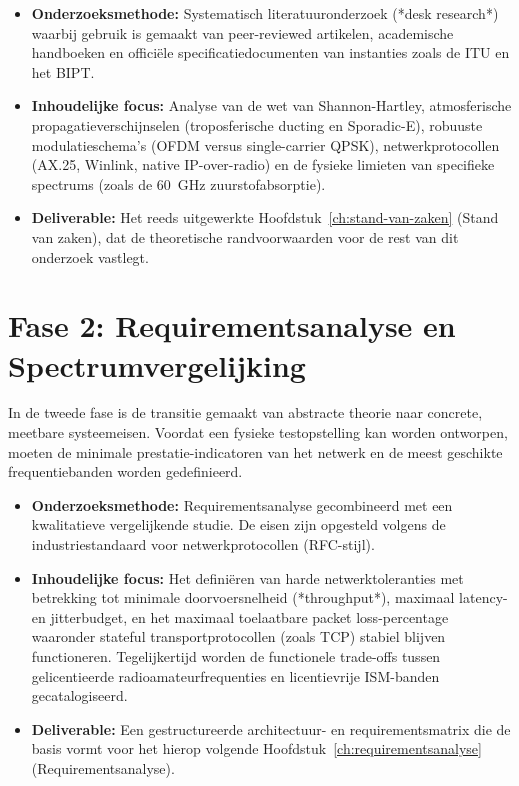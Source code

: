 \begin{itemize}
    \item \textbf{Onderzoeksmethode:} Systematisch literatuuronderzoek (*desk research*) 
    waarbij gebruik is gemaakt van peer-reviewed artikelen, academische handboeken en 
    officiële specificatiedocumenten van instanties zoals de ITU en het BIPT.
    \item \textbf{Inhoudelijke focus:} Analyse van de wet van Shannon-Hartley, atmosferische 
    propagatieverschijnselen (troposferische ducting en Sporadic-E), robuuste modulatieschema's 
    (OFDM versus single-carrier QPSK), netwerkprotocollen (AX.25, Winlink, native IP-over-radio) 
    en de fysieke limieten van specifieke spectrums (zoals de 60~GHz zuurstofabsorptie).
    \item \textbf{Deliverable:} Het reeds uitgewerkte Hoofdstuk~\ref{ch:stand-van-zaken} 
    (Stand van zaken), dat de theoretische randvoorwaarden voor de rest van dit onderzoek vastlegt.
\end{itemize}
 
\section{Fase 2: Requirementsanalyse en Spectrumvergelijking}
\label{sec:meth-fase2}
 
In de tweede fase is de transitie gemaakt van abstracte theorie naar concrete, meetbare 
systeemeisen. Voordat een fysieke testopstelling kan worden ontworpen, moeten de 
minimale prestatie-indicatoren van het netwerk en de meest geschikte frequentiebanden 
worden gedefinieerd.
 
\begin{itemize}
    \item \textbf{Onderzoeksmethode:} Requirementsanalyse gecombineerd met een 
    kwalitatieve vergelijkende studie. De eisen zijn opgesteld volgens de industriestandaard 
    voor netwerkprotocollen (RFC-stijl).
    \item \textbf{Inhoudelijke focus:} Het definiëren van harde netwerktoleranties 
    met betrekking tot minimale doorvoersnelheid (*throughput*), maximaal latency- en jitterbudget, 
    en het maximaal toelaatbare packet loss-percentage waaronder stateful transportprotocollen 
    (zoals TCP) stabiel blijven functioneren. Tegelijkertijd worden de functionele trade-offs 
    tussen gelicentieerde radioamateurfrequenties en licentievrije ISM-banden gecatalogiseerd.
    \item \textbf{Deliverable:} Een gestructureerde architectuur- en requirementsmatrix die de 
    basis vormt voor het hierop volgende Hoofdstuk~\ref{ch:requirementsanalyse} (Requirementsanalyse).
\end{itemize}

